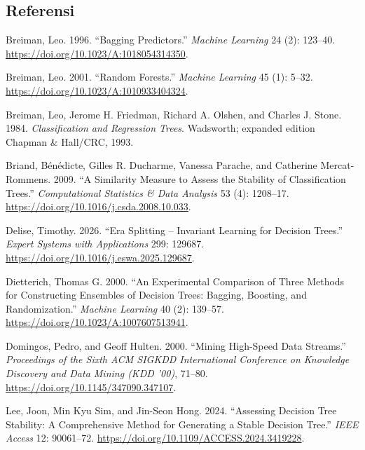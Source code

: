 \documentclass[
  conference]{IEEEtran}
\newlength{\cslhangindent}
\newenvironment{CSLReferences}[2] %
 {\begin{list}{}{%
  \setlength{\itemindent}{0pt}
  \setlength{\leftmargin}{0pt}
  \setlength{\parsep}{0pt}
  \ifodd #1
   \setlength{\leftmargin}{\cslhangindent}
   \setlength{\itemindent}{-1\cslhangindent}
  \fi
  \setlength{\itemsep}{#2\baselineskip}}}
 {\end{list}}
\begin{document}
\subsection{Referensi}\label{referensi}

\protect{}\label{refs}
\begin{CSLReferences}{1}{1}
Breiman, Leo. 1996. {``Bagging Predictors.''} \emph{Machine Learning} 24
(2): 123--40. \url{https://doi.org/10.1023/A:1018054314350}.

Breiman, Leo. 2001. {``Random Forests.''} \emph{Machine Learning} 45
(1): 5--32. \url{https://doi.org/10.1023/A:1010933404324}.

Breiman, Leo, Jerome H. Friedman, Richard A. Olshen, and Charles J.
Stone. 1984. \emph{Classification and Regression Trees}. Wadsworth;
expanded edition Chapman \& Hall/CRC, 1993.

Briand, Bénédicte, Gilles R. Ducharme, Vanessa Parache, and Catherine
Mercat-Rommens. 2009. {``A Similarity Measure to Assess the Stability of
Classification Trees.''} \emph{Computational Statistics \& Data
Analysis} 53 (4): 1208--17.
\url{https://doi.org/10.1016/j.csda.2008.10.033}.

Delise, Timothy. 2026. {``Era Splitting -- Invariant Learning for
Decision Trees.''} \emph{Expert Systems with Applications} 299: 129687.
\url{https://doi.org/10.1016/j.eswa.2025.129687}.

Dietterich, Thomas G. 2000. {``An Experimental Comparison of Three
Methods for Constructing Ensembles of Decision Trees: Bagging, Boosting,
and Randomization.''} \emph{Machine Learning} 40 (2): 139--57.
\url{https://doi.org/10.1023/A:1007607513941}.

Domingos, Pedro, and Geoff Hulten. 2000. {``Mining High-Speed Data
Streams.''} \emph{Proceedings of the Sixth ACM SIGKDD International
Conference on Knowledge Discovery and Data Mining (KDD '00)}, 71--80.
\url{https://doi.org/10.1145/347090.347107}.

Lee, Joon, Min Kyu Sim, and Jin-Seon Hong. 2024. {``Assessing Decision
Tree Stability: A Comprehensive Method for Generating a Stable Decision
Tree.''} \emph{IEEE Access} 12: 90061--72.
\url{https://doi.org/10.1109/ACCESS.2024.3419228}.


\end{CSLReferences}
\end{document}
